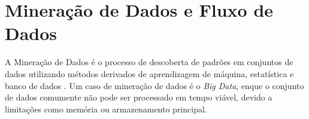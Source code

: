 \section{Mineração de Dados e Fluxo de Dados}


A Mineração de Dados é o processo de descoberta de padrões em conjuntos de dados
utilizando métodos derivados de aprendizagem de máquina, estatística e banco de
dados \cite{Gaber2005}.
Um caso de mineração de dados é o \emph{Big Data}, enque o
conjunto de dados comumente não pode ser processado em tempo viável, devido a limitações
como memória ou armazenamento principal.

% 
% 


% 

